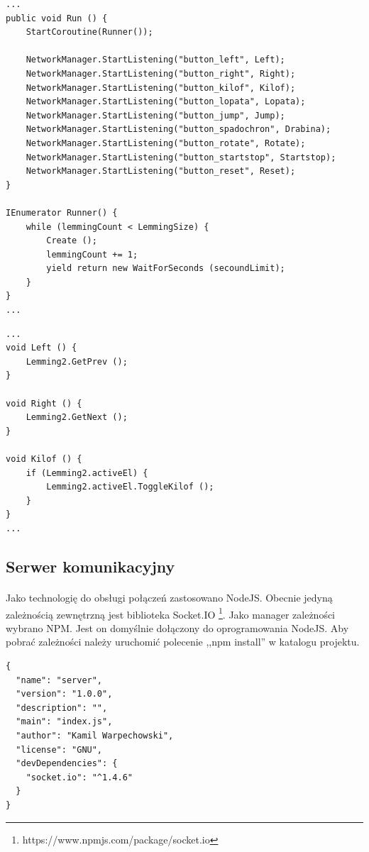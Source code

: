 \begin{lstlisting}[language=CSharp]
...
public void Run () {
	StartCoroutine(Runner());

	NetworkManager.StartListening("button_left", Left);
	NetworkManager.StartListening("button_right", Right);
	NetworkManager.StartListening("button_kilof", Kilof);
	NetworkManager.StartListening("button_lopata", Lopata);
	NetworkManager.StartListening("button_jump", Jump);
	NetworkManager.StartListening("button_spadochron", Drabina);
	NetworkManager.StartListening("button_rotate", Rotate);
	NetworkManager.StartListening("button_startstop", Startstop);
	NetworkManager.StartListening("button_reset", Reset);
}

IEnumerator Runner() {
	while (lemmingCount < LemmingSize) {
		Create ();
		lemmingCount += 1;
		yield return new WaitForSeconds (secoundLimit);
	}
}
...
\end{lstlisting}

\begin{lstlisting}[language=CSharp]
...
void Left () {
	Lemming2.GetPrev ();
}

void Right () {
	Lemming2.GetNext ();
}

void Kilof () {
	if (Lemming2.activeEl) {
		Lemming2.activeEl.ToggleKilof ();
	}
}
...
\end{lstlisting}

\subsection{Serwer komunikacyjny}
\paragraph{}
Jako technologię do obsługi połączeń zastosowano NodeJS. Obecnie jedyną zależnością zewnętrzną jest biblioteka Socket.IO \footnote{https://www.npmjs.com/package/socket.io}.
Jako manager zależności wybrano NPM. Jest on domyślnie dołączony do oprogramowania NodeJS. Aby pobrać zależności należy uruchomić polecenie ,,npm install'' w katalogu projektu.

\begin{lstlisting}[language=CSharp]
{
  "name": "server",
  "version": "1.0.0",
  "description": "",
  "main": "index.js",
  "author": "Kamil Warpechowski",
  "license": "GNU",
  "devDependencies": {
    "socket.io": "^1.4.6"
  }
}
\end{lstlisting}

